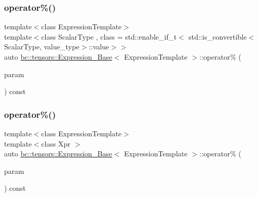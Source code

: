\subsubsection{\texorpdfstring{operator\%()}{operator\%()}\hspace{0.1cm}{\footnotesize\ttfamily [1/2]}}
{\footnotesize\ttfamily template$<$class Expression\+Template$>$ \\
template$<$class Scalar\+Type , class  = std\+::enable\+\_\+if\+\_\+t$<$   std\+::is\+\_\+convertible$<$\+Scalar\+Type, value\+\_\+type$>$\+::value$>$$>$ \\
auto \hyperlink{classbc_1_1tensors_1_1Expression__Base}{bc\+::tensors\+::\+Expression\+\_\+\+Base}$<$ Expression\+Template $>$\+::operator\% (\begin{DoxyParamCaption}\item[{const Scalar\+Type \&}]{param }\end{DoxyParamCaption}) const\hspace{0.3cm}{\ttfamily [inline]}}

\mbox{\label{classbc_1_1tensors_1_1Expression__Base_ade41bf172c635b1320b304ec06e7eb97}} 
\subsubsection{\texorpdfstring{operator\%()}{operator\%()}\hspace{0.1cm}{\footnotesize\ttfamily [2/2]}}
{\footnotesize\ttfamily template$<$class Expression\+Template$>$ \\
template$<$class Xpr $>$ \\
auto \hyperlink{classbc_1_1tensors_1_1Expression__Base}{bc\+::tensors\+::\+Expression\+\_\+\+Base}$<$ Expression\+Template $>$\+::operator\% (\begin{DoxyParamCaption}\item[{const \hyperlink{classbc_1_1tensors_1_1Expression__Base}{Expression\+\_\+\+Base}$<$ Xpr $>$ \&}]{param }\end{DoxyParamCaption}) const\hspace{0.3cm}{\ttfamily [inline]}}

\mbox{\label{classbc_1_1tensors_1_1Expression__Base_a1c0058cc6f1c132001e4c1afb9582066}} 
